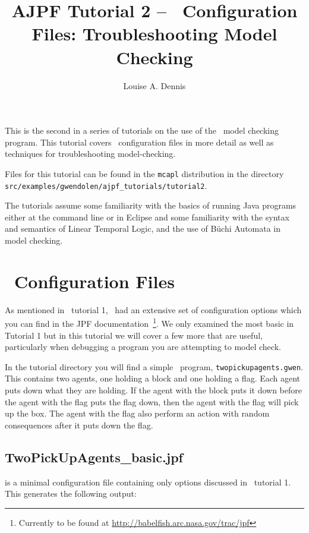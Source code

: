 \documentclass[a4]{article}
\author{Louise A. Dennis}
\title{AJPF Tutorial 2 -- \jpf\ Configuration Files: Troubleshooting Model Checking}
\begin{document}
\maketitle
This is the second in a series of tutorials on the use of the \ajpf\ model checking program.  This tutorial covers \jpf\ configuration files in more detail as well as techniques for troubleshooting model-checking.

Files for this tutorial can be found in the \texttt{mcapl} distribution in the directory \texttt{src/examples/gwendolen/ajpf\_tutorials/tutorial2}.

The tutorials assume some familiarity with the basics of running Java programs either at the command line or in Eclipse and some familiarity with the syntax and semantics of Linear Temporal Logic, and the use of B\"{u}chi Automata in model checking.

\section{\jpf\ Configuration Files}
As mentioned in \ajpf\ tutorial 1, \jpf\ had an extensive set of configuration options which you can find in the JPF documentation~\footnote{Currently to be found at \url{http://babelfish.arc.nasa.gov/trac/jpf}}. We only examined the most basic in Tutorial 1 but in this tutorial we will cover a few more that are useful, particularly when debugging a program you are attempting to model check.

In the tutorial directory you will find a simple \gwendolen\ program, \texttt{twopickupagents.gwen}.  This contains two agents, one holding a block and one holding a flag.  Each agent puts down what they are holding.  If the agent with the block puts it down before the agent with the flag puts the flag down, then the agent with the flag will pick up the box.  The agent with the flag also perform an action with random consequences after it puts down the flag.

\subsection{TwoPickUpAgents\_basic.jpf} is a minimal configuration file containing only options discussed in \ajpf\ tutorial 1.  This generates the following output:
\end{document}
